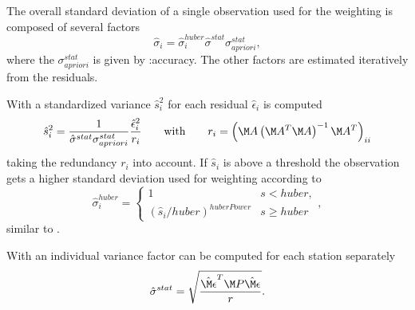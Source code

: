 The overall standard deviation of a single observation used for the weighting
is composed of several factors
\begin{equation}
  \hat{\sigma}_i = \hat{\sigma}_i^{huber} \hat{\sigma}^{stat} \sigma_{apriori}^{stat},
\end{equation} where the $\sigma_{apriori}^{stat}$ is given by :accuracy.
The other factors are estimated iteratively from the residuals.

With  a standardized variance $\hat{s}_i^2$
for each residual $\hat{\epsilon}_i$ is computed
\begin{equation}
  \hat{s}_i^2 = \frac{1}{\hat{\sigma}^{stat} \sigma_{apriori}^{stat}}\frac{\hat{\epsilon}_i^2}{r_i}
  \qquad\text{with}\qquad
  r_i = \left(\M A\left(\M A^T\M A\right)^{-1}\M A^T\right)_{ii}
\end{equation}
taking the redundancy $r_i$ into account. If $\hat{s}_i$ is above a threshold 
the observation gets a higher standard deviation used for weighting according to
\begin{equation}
  \hat{\sigma}_i^{huber} =
  \left\{ \begin{array}{ll}
    1                              & s < huber,\\
    (\hat{s}_i/huber)^{huberPower} & s \ge huber
  \end{array} \right.,
\end{equation}
similar to .

With  an individual variance factor can be computed for each station separately
\begin{equation}
  \hat{\sigma}^{stat} = \sqrt{\frac{\hat{\M\epsilon}^T\M P\hat{\M\epsilon}}{r}}.
\end{equation}


